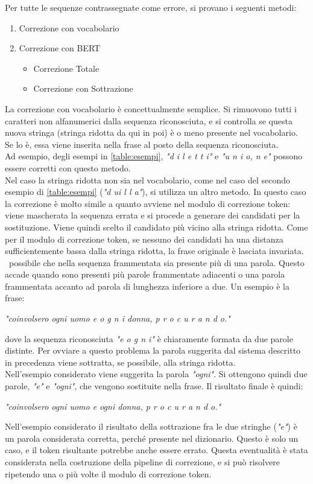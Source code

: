 \documentclass[12pt]{article}
\begin{document}
Per tutte le sequenze contrassegnate come errore, si provano i seguenti metodi:
\begin{enumerate}
\item Correzione con vocabolario
\item Correzione con BERT
	\begin{itemize}
	\item Correzione Totale
	\item Correzione con Sottrazione
	\end{itemize}
\end{enumerate}
La correzione con vocabolario è concettualmente semplice. Si rimuovono tutti i caratteri non alfanumerici dalla sequenza riconosciuta, e si controlla se questa nuova stringa (stringa ridotta da qui in poi) è o meno presente nel vocabolario. Se lo è, essa viene inserita nella frase al posto della sequenza riconosciuta.\\
Ad esempio, degli esempi in \autoref{table:esempi}, \textit{"d i l e t t i"} e \textit{"u n i o, n e"} possono essere corretti con questo metodo.\\
Nel caso la stringa ridotta non sia nel vocabolario, come nel caso del secondo esempio di \autoref{table:esempi} (\textit{"d ui l l a"}), si utilizza un altro metodo. In questo caso la correzione è molto simile a quanto avviene nel modulo di correzione token: viene mascherata la sequenza errata e si procede a generare dei candidati per la sostituzione. Viene quindi scelto il candidato più vicino alla stringa ridotta. Come per il modulo di correzione token, se nessuno dei candidati ha una distanza sufficientemente bassa dalla stringa ridotta, la frase originale è lasciata invariata.\\
\E\ possibile che nella sequenza frammentata sia presente più di una parola. Questo accade quando sono presenti più parole frammentate adiacenti o una parola frammentata accanto ad parola di lunghezza inferiore a due. Un esempio è la frase:
\begin{center}
\textit{"coinvolsero ogni uomo e o g n i donna, p r o c u r a n d o."}
\end{center}
dove la sequenza riconosciuta \textit{"e o g n i"} è chiaramente formata da due parole distinte. Per ovviare a questo problema la parola suggerita dal sistema descritto in precedenza viene sottratta, se possibile, alla stringa ridotta.\\
Nell'esempio considerato viene suggerita la parola \textit{"ogni"}. Si ottengono quindi due parole, \textit{"e"} e \textit{"ogni"}, che vengono sostituite nella frase. Il risultato finale è quindi:
\begin{center}
\textit{"coinvolsero ogni uomo e ogni donna, p r o c u r a n d o."}
\end{center}
Nell'esempio considerato il risultato della sottrazione fra le due stringhe (\textit{"e"}) è un parola considerata corretta, perché presente nel dizionario. Questo è solo un caso, e il token risultante potrebbe anche essere errato. Questa eventualità è stata considerata nella costruzione della pipeline di correzione, e si può risolvere ripetendo una o più volte il modulo di correzione token.
\end{document}
